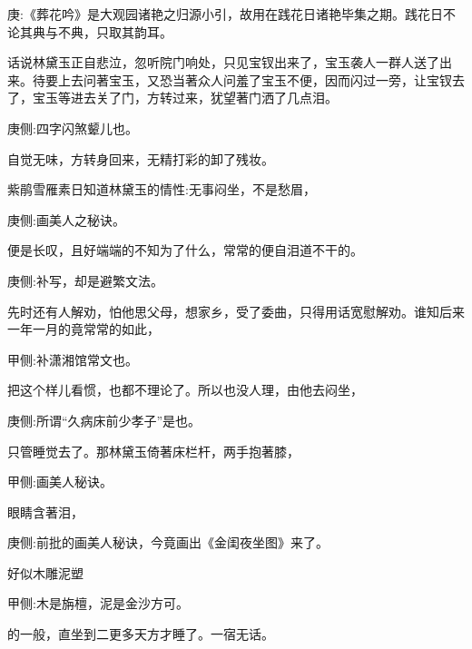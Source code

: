 
\begin{parag}
    \begin{note}庚:《葬花吟》是大观园诸艳之归源小引，故用在践花日诸艳毕集之期。践花日不论其典与不典，只取其韵耳。\end{note}
\end{parag}


\begin{parag}
    话说林黛玉正自悲泣，忽听院门响处，只见宝钗出来了，宝玉袭人一群人送了出来。待要上去问著宝玉，又恐当著众人问羞了宝玉不便，因而闪过一旁，让宝钗去了，宝玉等进去关了门，方转过来，犹望著门洒了几点泪。\begin{note}庚侧:四字闪煞颦儿也。\end{note}自觉无味，方转身回来，无精打彩的卸了残妆。
\end{parag}


\begin{parag}
    紫鹃雪雁素日知道林黛玉的情性:无事闷坐，不是愁眉，\begin{note}庚侧:画美人之秘诀。\end{note}便是长叹，且好端端的不知为了什么，常常的便自泪道不干的。\begin{note}庚侧:补写，却是避繁文法。\end{note}先时还有人解劝，怕他思父母，想家乡，受了委曲，只得用话宽慰解劝。谁知后来一年一月的竟常常的如此，\begin{note}甲侧:补潇湘馆常文也。\end{note}把这个样儿看惯，也都不理论了。所以也没人理，由他去闷坐，\begin{note}庚侧:所谓“久病床前少孝子”是也。\end{note}只管睡觉去了。那林黛玉倚著床栏杆，两手抱著膝，\begin{note}甲侧:画美人秘诀。\end{note}眼睛含著泪，\begin{note}庚侧:前批的画美人秘诀，今竟画出《金闺夜坐图》来了。\end{note}好似木雕泥塑\begin{note}甲侧:木是旃檀，泥是金沙方可。\end{note}的一般，直坐到二更多天方才睡了。一宿无话。
\end{parag}


